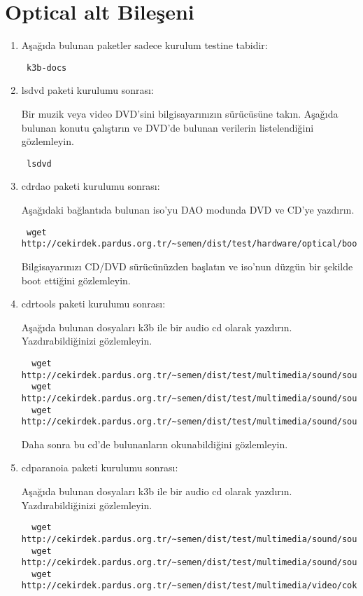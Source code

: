 \documentclass[a4paper,10pt]{article}
\begin{document}
\section{Optical alt Bileşeni}
\begin{enumerate}

\item Aşağıda bulunan paketler sadece kurulum testine tabidir:

\begin{verbatim}
 k3b-docs
\end{verbatim}

\item lsdvd paketi kurulumu sonrası:

Bir muzik veya video DVD'sini bilgisayarınızın sürücüsüne takın. Aşağıda bulunan konutu çalıştırın ve DVD'de bulunan verilerin listelendiğini gözlemleyin. 
\begin{verbatim}
 lsdvd
\end{verbatim}

\item cdrdao paketi kurulumu sonrası:

Aşağıdaki bağlantıda bulunan iso'yu DAO modunda DVD ve CD'ye yazdırın. 
\begin{verbatim}
 wget http://cekirdek.pardus.org.tr/~semen/dist/test/hardware/optical/boot.iso
\end{verbatim}

Bilgisayarınızı CD/DVD sürücünüzden başlatın ve iso'nun düzgün bir şekilde boot ettiğini gözlemleyin.


 \item cdrtools paketi kurulumu sonrası:

Aşağıda bulunan dosyaları k3b ile bir audio cd olarak yazdırın. Yazdırabildiğinizi gözlemleyin.
 \begin{verbatim}
  wget http://cekirdek.pardus.org.tr/~semen/dist/test/multimedia/sound/sound/sample.wav
  wget http://cekirdek.pardus.org.tr/~semen/dist/test/multimedia/sound/sound/sample.mp3
  wget http://cekirdek.pardus.org.tr/~semen/dist/test/multimedia/sound/sound/sample.ogg
 \end{verbatim}

Daha sonra bu cd'de bulunanların okunabildiğini gözlemleyin.
 \item cdparanoia paketi kurulumu sonrası:

Aşağıda bulunan dosyaları k3b ile bir audio cd olarak yazdırın. Yazdırabildiğinizi gözlemleyin.
 \begin{verbatim}
  wget http://cekirdek.pardus.org.tr/~semen/dist/test/multimedia/sound/sound/sample.wav
  wget http://cekirdek.pardus.org.tr/~semen/dist/test/multimedia/sound/sound/sample.mp3
  wget http://cekirdek.pardus.org.tr/~semen/dist/test/multimedia/video/cokluortam/linux.ogg
 \end{verbatim}


\end{enumerate}
\end{document}
